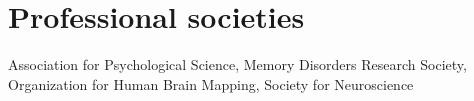 \section*{Professional societies}
\noindent

Association for Psychological Science, Memory Disorders Research Society, Organization for Human Brain Mapping, Society for Neuroscience

